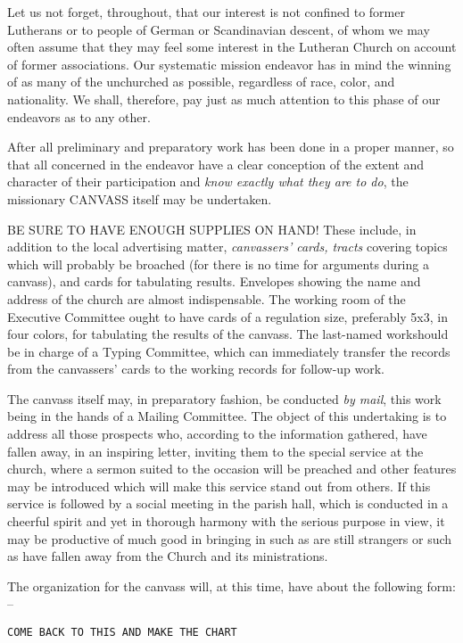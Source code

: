 \documentclass[
]{book}
\begin{document}
Let us not forget, throughout, that our interest is not confined to former Lutherans or to people of German or Scandinavian descent, of whom we may often assume that they may feel some interest in the Lutheran Church on account of former associations. Our systematic mission endeavor has in mind the winning of as many of the unchurched as possible, regardless of race, color, and nationality. We shall, therefore, pay just as much attention to this phase of our endeavors as to any other.

After all preliminary and preparatory work has been done in a proper manner, so that all concerned in the endeavor have a clear conception of the extent and character of their participation and \emph{know exactly what they are to do}, the missionary CANVASS itself may be undertaken.

BE SURE TO HAVE ENOUGH SUPPLIES ON HAND! These include, in addition to the local advertising matter, \emph{canvassers' cards, tracts} covering topics which will probably be broached (for there is no time for arguments during a canvass), and cards for tabulating results. Envelopes showing the name and address of the church are almost indispensable. The working room of the Executive Committee ought to have cards of a regulation size, preferably 5x3, in four colors, for tabulating the results of the canvass. The last-named workshould be in charge of a Typing Committee, which can immediately transfer the records from the canvassers' cards to the working records for follow-up work.

The canvass itself may, in preparatory fashion, be conducted \emph{by mail}, this work being in the hands of a Mailing Committee. The object of this undertaking is to address all those prospects who, according to the information gathered, have fallen away, in an inspiring letter, inviting them to the special service at the church, where a sermon suited to the occasion will be preached and other features may be introduced which will make this service stand out from others. If this service is followed by a social meeting in the parish hall, which is conducted in a cheerful spirit and yet in thorough harmony with the serious purpose in view, it may be productive of much good in bringing in such as are still strangers or such as have fallen away from the Church and its ministrations.

The organization for the canvass will, at this time, have about the following form: --

\begin{verbatim}
COME BACK TO THIS AND MAKE THE CHART
\end{verbatim}
\end{document}
